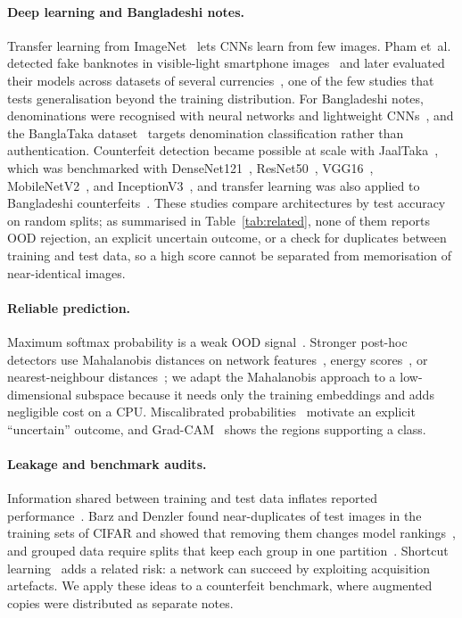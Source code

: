 \documentclass[pdflatex,sn-mathphys-num]{sn-jnl}
\begin{document}
\paragraph{Deep learning and Bangladeshi notes.} Transfer learning from
ImageNet~\cite{deng2009imagenet,yosinski2014transferable} lets CNNs learn from few
images. Pham et~al. detected fake banknotes in visible-light smartphone
images~\cite{pham2020} and later evaluated their models across datasets of several
currencies~\cite{pham2022}, one of the few studies that tests generalisation beyond the
training distribution. For Bangladeshi notes, denominations were recognised with neural
networks and lightweight CNNs~\cite{jahangir2007,linkon2020}, and the BanglaTaka
dataset~\cite{nuhash2025banglataka} targets denomination classification rather than
authentication. Counterfeit detection became possible at scale with
JaalTaka~\cite{piyas2025jaaltaka}, which was benchmarked with
DenseNet121~\cite{huang2017densenet}, ResNet50~\cite{he2016resnet},
VGG16~\cite{simonyan2015vgg}, MobileNetV2~\cite{sandler2018mobilenetv2}, and
InceptionV3~\cite{szegedy2016inception}, and transfer learning was also applied to
Bangladeshi counterfeits~\cite{tabassum2025}.
These studies compare architectures by test accuracy on random splits; as summarised in
Table~\ref{tab:related}, none of them reports OOD rejection, an explicit uncertain
outcome, or a check for duplicates between training and test data, so a high score
cannot be separated from memorisation of near-identical images.

\paragraph{Reliable prediction.} Maximum softmax probability is a weak OOD
signal~\cite{hendrycks2017baseline}. Stronger post-hoc detectors use Mahalanobis
distances on network features~\cite{lee2018mahalanobis}, energy
scores~\cite{liu2020energy}, or nearest-neighbour distances~\cite{sun2022knn}; we adapt
the Mahalanobis approach to a low-dimensional subspace because it needs only the training
embeddings and adds negligible cost on a CPU. Miscalibrated
probabilities~\cite{guo2017calibration} motivate an explicit ``uncertain'' outcome, and
Grad-CAM~\cite{selvaraju2017gradcam} shows the regions supporting a class.

\paragraph{Leakage and benchmark audits.} Information shared between training and test
data inflates reported performance~\cite{kaufman2012leakage,kapoor2023leakage}.
Barz and Denzler found near-duplicates of test images in the training sets of CIFAR and
showed that removing them changes model rankings~\cite{barz2020cifair}, and grouped data
require splits that keep each group in one partition~\cite{roberts2017cv}. Shortcut
learning~\cite{geirhos2020shortcut} adds a related risk: a network can succeed by
exploiting acquisition artefacts. We apply these ideas to a counterfeit benchmark, where
augmented copies were distributed as separate notes.
\end{document}
